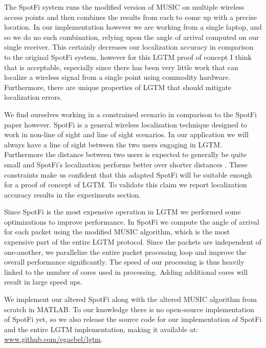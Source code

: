 \documentclass[12pt]{report}
\begin{document}

The SpotFi system runs the modified version of MUSIC on multiple wireless access points and then combines the results from each to come up with a precise location. In our implementation however we are working from a single laptop, and so we do no such combination, relying upon the angle of arrival computed on our single receiver. This certainly decreases our localization accuracy in comparison to the original SpotFi system, however for this LGTM proof of concept I think that is acceptable, especially since there has been very little work that can localize a wireless signal from a single point using commodity hardware. Furthermore, there are unique properties of LGTM that should mitigate localization errors. \par

We find ourselves working in a constrained scenario in comparison to the SpotFi paper however. SpotFi is a general wireless localization technique designed to work in non-line of sight and line of sight scenarios. In our application we will always have a line of sight between the two users engaging in LGTM. Furthermore the distance between two users is expected to generally be quite small and SpotFi's localization performs better over shorter distances \cite{SpotFiKotaru2015}. These constraints make us confident that this adapted SpotFi will be suitable enough for a proof of concept of LGTM. To validate this claim we report localization accuracy results in the experiments section. \par

Since SpotFi is the most expensive operation in LGTM we performed some optimizations to improve performance. In SpotFi we compute the angle of arrival for each packet using the modified MUSIC algorithm, which is the most expensive part of the entire LGTM protocol. Since the packets are independent of one-another, we parallelize the entire packet processing loop and improve the overall performance significantly. The speed of our processing is thus heavily linked to the number of cores used in processing. Adding additional cores will result in large speed ups. \par

We implement our altered SpotFi along with the altered MUSIC algorithm from scratch in MATLAB. To our knowledge there is no open-source implementation of SpotFi yet, so we also release the source code for our implementation of SpotFi and the entire LGTM implementation, making it available at: \url{www.github.com/egaebel/lgtm}. \par
\end{document}
